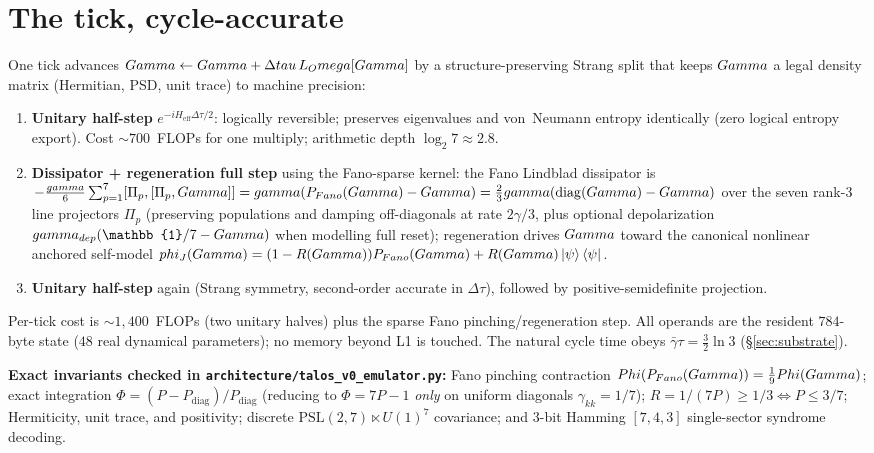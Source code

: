 \section{The tick, cycle-accurate}
\label{app:tick}

One \TALOS{} tick advances $Gamma\leftarrow Gamma+\Delta tau\,L_Omega[Gamma]$
by a structure-preserving Strang split that keeps $Gamma$ a legal density
matrix (Hermitian, PSD, unit trace) to machine precision:
\begin{enumerate}[leftmargin=1.6em,itemsep=1pt]
  \item \textbf{Unitary half-step} $e^{-i H_{\mathrm{eff}}\Delta\tau/2}$:
        logically reversible; preserves eigenvalues and von~Neumann entropy
        identically (zero logical entropy export). Cost $\sim\!700$~FLOPs for
        one \DM{} multiply; arithmetic depth $\log_2 7\approx 2.8$.
  \item \textbf{Dissipator + regeneration full step} using the Fano-sparse
        kernel: the Fano Lindblad dissipator is
        $-\tfrac{gamma}{6}\sum_{p=1}^7[\Pi_p,[\Pi_p,Gamma]]
        = gamma(P_{Fano}(Gamma)-Gamma)
        = \tfrac{2}{3}gamma(\operatorname{diag}(Gamma)-Gamma)$ over the seven
        rank-$3$ line projectors $\Pi_p$ (preserving populations and damping
        off-diagonals at rate $2\gamma/3$, plus optional depolarization
        $\gamma_{\mathrm{dep}}(\mathbb{1}/7-\Gam)$ when modelling full reset);
        regeneration drives $Gamma$ toward the canonical nonlinear anchored
        self-model $phi_J(Gamma)=(1-R(Gamma))P_{Fano}(Gamma)
        + R(Gamma)\ket{\psi}\bra{\psi}$.
  \item \textbf{Unitary half-step} again (Strang symmetry, second-order
        accurate in $\Delta\tau$), followed by positive-semidefinite
        projection.
\end{enumerate}
Per-tick cost is $\sim\!1{,}400$~FLOPs (two unitary halves) plus the sparse
Fano pinching/regeneration step. All operands are the resident $784$-byte state
($48$ real dynamical parameters); no memory beyond L1 is touched. The natural
cycle time obeys $\bar\gamma\tau=\tfrac32\ln3$ (\S\ref{sec:substrate}).

\noindent\textbf{Exact invariants checked in
\texttt{architecture/talos\_v0\_emulator.py}:} Fano pinching contraction
$Phi(P_{Fano}(Gamma))=\tfrac19Phi(Gamma)$; exact
integration $\Phi=(P-P_{\mathrm{diag}})/P_{\mathrm{diag}}$ (reducing to
$\Phi=7P-1$ \emph{only} on uniform diagonals $\gamma_{kk}=1/7$);
$R=1/(7P)\ge 1/3\Leftrightarrow P\le 3/7$; Hermiticity, unit trace, and
positivity; discrete $\mathrm{PSL}(2,7)\ltimes U(1)^7$ covariance; and $3$-bit
Hamming $[7,4,3]$ single-sector syndrome decoding.
